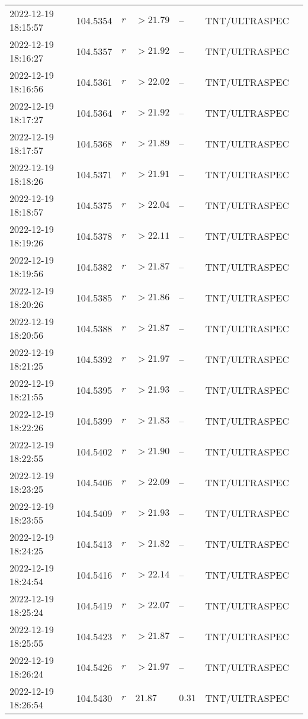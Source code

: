 \documentclass{nature_plusfigure}
\begin{document}
\begin{supplement}
\begin{center}
\begin{longtable}{lllllll}
2022-12-19 18:15:57 & 104.5354 & $r$ & $>21.79$ & -- & TNT/ULTRASPEC &  \\ 
2022-12-19 18:16:27 & 104.5357 & $r$ & $>21.92$ & -- & TNT/ULTRASPEC &  \\ 
2022-12-19 18:16:56 & 104.5361 & $r$ & $>22.02$ & -- & TNT/ULTRASPEC &  \\ 
2022-12-19 18:17:27 & 104.5364 & $r$ & $>21.92$ & -- & TNT/ULTRASPEC &  \\ 
2022-12-19 18:17:57 & 104.5368 & $r$ & $>21.89$ & -- & TNT/ULTRASPEC &  \\ 
2022-12-19 18:18:26 & 104.5371 & $r$ & $>21.91$ & -- & TNT/ULTRASPEC &  \\ 
2022-12-19 18:18:57 & 104.5375 & $r$ & $>22.04$ & -- & TNT/ULTRASPEC &  \\ 
2022-12-19 18:19:26 & 104.5378 & $r$ & $>22.11$ & -- & TNT/ULTRASPEC &  \\ 
2022-12-19 18:19:56 & 104.5382 & $r$ & $>21.87$ & -- & TNT/ULTRASPEC &  \\ 
2022-12-19 18:20:26 & 104.5385 & $r$ & $>21.86$ & -- & TNT/ULTRASPEC &  \\ 
2022-12-19 18:20:56 & 104.5388 & $r$ & $>21.87$ & -- & TNT/ULTRASPEC &  \\ 
2022-12-19 18:21:25 & 104.5392 & $r$ & $>21.97$ & -- & TNT/ULTRASPEC &  \\ 
2022-12-19 18:21:55 & 104.5395 & $r$ & $>21.93$ & -- & TNT/ULTRASPEC &  \\ 
2022-12-19 18:22:26 & 104.5399 & $r$ & $>21.83$ & -- & TNT/ULTRASPEC &  \\ 
2022-12-19 18:22:55 & 104.5402 & $r$ & $>21.90$ & -- & TNT/ULTRASPEC &  \\ 
2022-12-19 18:23:25 & 104.5406 & $r$ & $>22.09$ & -- & TNT/ULTRASPEC &  \\ 
2022-12-19 18:23:55 & 104.5409 & $r$ & $>21.93$ & -- & TNT/ULTRASPEC &  \\ 
2022-12-19 18:24:25 & 104.5413 & $r$ & $>21.82$ & -- & TNT/ULTRASPEC &  \\ 
2022-12-19 18:24:54 & 104.5416 & $r$ & $>22.14$ & -- & TNT/ULTRASPEC &  \\ 
2022-12-19 18:25:24 & 104.5419 & $r$ & $>22.07$ & -- & TNT/ULTRASPEC &  \\ 
2022-12-19 18:25:55 & 104.5423 & $r$ & $>21.87$ & -- & TNT/ULTRASPEC &  \\ 
2022-12-19 18:26:24 & 104.5426 & $r$ & $>21.97$ & -- & TNT/ULTRASPEC &  \\ 
2022-12-19 18:26:54 & 104.5430 & $r$ & $21.87$ & $0.31$ & TNT/ULTRASPEC &  \\ 

\end{longtable}
\end{center}
\end{supplement}
\end{document}
